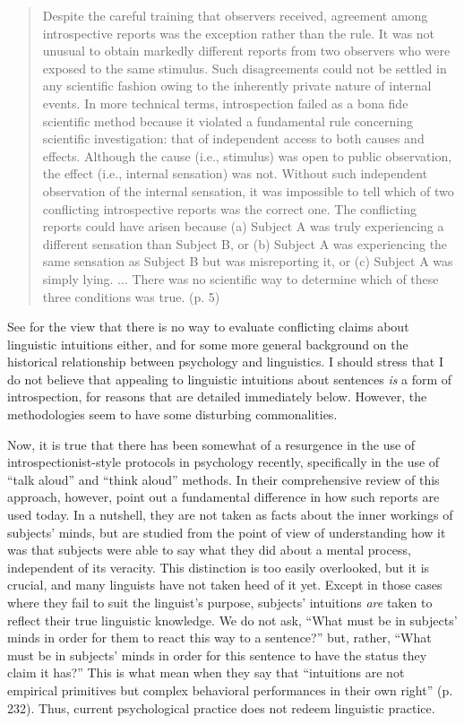 \begin{quote}
Despite the careful training that observers received, agreement among introspective reports was the exception rather than the rule. It was not unusual to obtain markedly different reports from two observers who were exposed to the same stimulus. Such disagreements could not be settled in any scientific fashion owing to the inherently private nature of internal events. In more technical terms, introspection failed as a bona fide scientific method because it violated a fundamental rule concerning scientific investigation: that of independent access to both causes and effects. Although the cause (i.e., stimulus) was open to public observation, the effect (i.e., internal sensation) was not. Without such independent observation of the internal sensation, it was impossible to tell which of two conflicting introspective reports was the correct one. The conflicting reports could have arisen because (a) Subject A was truly experiencing a different sensation than Subject B, or (b) Subject A was experiencing the same sensation as Subject B but was misreporting it, or (c) Subject A was simply lying. ... There was no scientific way to determine which of these three conditions was true. (p. 5)
\end{quote}

\noindent
See \citet{Householder1965} for the view that there is no way to evaluate conflicting claims about linguistic intuitions either, and \citet{Levelt1972} for some more general background on the historical relationship between psychology and linguistics. I should stress that I do not believe that appealing to linguistic intuitions about sentences \textit{is} a form of introspection, for reasons that are detailed immediately below. However, the methodologies seem to have some disturbing commonalities.

Now, it is true that there has been somewhat of a resurgence in the use of introspectionist-style protocols in psychology recently, specifically in the use of ``talk aloud'' and ``think aloud'' methods. In their comprehensive review of this approach, however, \citet{EricssonEtAl1984} point out a fundamental difference in how such reports are used today. In a nutshell, they are not taken as facts about the inner workings of subjects' minds, but are studied from the point of view of understanding how it was that subjects were able to say what they did about a mental process, independent of its veracity. This distinction is too easily overlooked, but it is crucial, and many linguists have not taken heed of it yet. Except in those cases where they fail to suit the linguist's purpose, subjects' intuitions \textit{are} taken to reflect their true linguistic knowledge. We do not ask, ``What must be in subjects' minds in order for them to react this way to a sentence?'' but, rather, ``What must be in subjects' minds in order for this sentence to have the status they claim it has?'' This is what \citet{BeverEtAl1981} mean when they say that ``intuitions are not empirical primitives but complex behavioral performances in their own right'' (p. 232). Thus, current psychological practice does not redeem linguistic practice.


